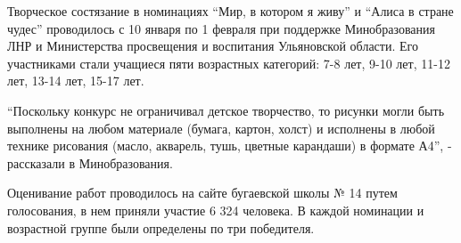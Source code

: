 Творческое состязание в номинациях \enquote{Мир, в котором я живу} и \enquote{Алиса в стране
чудес} проводилось с 10 января по 1 февраля при поддержке Минобразования ЛНР и
Министерства просвещения и воспитания Ульяновской области. Его участниками
стали учащиеся пяти возрастных категорий: 7-8 лет, 9-10 лет, 11-12 лет, 13-14
лет, 15-17 лет.


\enquote{Поскольку конкурс не ограничивал детское творчество, то рисунки могли быть
выполнены на любом материале (бумага, картон, холст) и исполнены в любой
технике рисования (масло, акварель, тушь, цветные карандаши) в формате А4}, -
рассказали в Минобразования.


Оценивание работ проводилось на сайте бугаевской школы № 14 путем голосования,
в нем приняли участие 6 324 человека. В каждой номинации и возрастной группе
были определены по три победителя.


